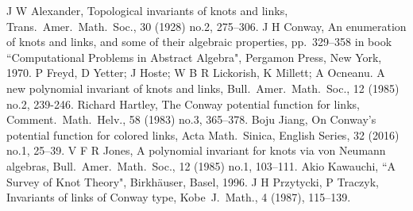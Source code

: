 \documentclass[12pt]{amsart}
\theoremstyle{definition}
\theoremstyle{remark}
\begin{document}
\begin{thebibliography}{8}
 J W Alexander, Topological invariants of knots and links,
    Trans.\ Amer.\ Math.\ Soc., 30 (1928) no.2, 275--306.
 J H Conway, An enumeration of knots and links, and some of their algebraic properties,
    pp.~329--358 in book ``Computational Problems in Abstract Algebra", Pergamon Press, New York, 1970.
 P Freyd, D Yetter; J Hoste; W B R Lickorish, K Millett; A Ocneanu.
    A new polynomial invariant of knots and links,
    Bull.\ Amer.\ Math.\ Soc., 12 (1985) no.2, 239-246.
Richard Hartley, The Conway potential function for links,
    Comment.\ Math.\ Helv., 58 (1983) no.3, 365--378.
 Boju Jiang, On Conway's potential function for colored links,
    Acta Math.\ Sinica, English Series, 32 (2016) no.1, 25--39.
 V F R Jones, A polynomial invariant for knots via von Neumann algebras,
    Bull.\ Amer.\ Math.\ Soc., 12 (1985) no.1, 103--111.
 Akio Kawauchi, ``A Survey of Knot Theory",
    Birkh\"auser, Basel, 1996.
 J H Przytycki, P Traczyk, Invariants of links of Conway type,
    Kobe\ J.\ Math., 4 (1987), 115--139.
\end{thebibliography}
\end{document}
